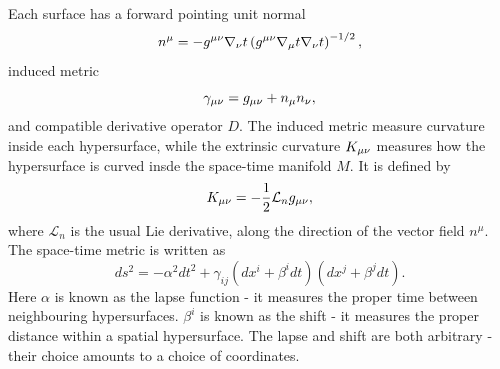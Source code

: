  Each surface has a forward pointing unit normal
\begin{equation}
n^{\mu}=-g^{\mu\nu}\nabla_{\nu}t\left(g^{\mu\nu}\nabla_{\mu}t\nabla_{\nu}t\right)^{-1/2},
\end{equation}
induced metric
\begin{equation}
\gamma_{\mu\nu}=g_{\mu\nu}+n_{\mu}n_{\nu},
\end{equation}
and compatible derivative operator $D$.
The induced metric measure curvature inside each hypersurface, while the extrinsic curvature $K_{\mu\nu}$ measures how the hypersurface is curved insde the space-time manifold $M$. It is defined by 
\begin{equation}
K_{\mu\nu}=-\frac{1}{2}\mathcal{L}_{n}g_{\mu\nu},
\end{equation}
where $\mathcal{L}_n$ is the usual Lie derivative, along the direction of the vector field $n^{\mu}$.
The space-time metric is written as
\begin{equation}
ds^2=-\alpha^2dt^2 + \gamma_{ij}\left(dx^i+\beta^idt\right)\left(dx^j+\beta^jdt\right).
\end{equation}
Here $\alpha$ is known as the lapse function - it measures the proper time between neighbouring hypersurfaces. $\beta^i$ is known as the shift - it measures the proper distance within a spatial hypersurface. The lapse and shift are both arbitrary - their choice amounts to a choice of coordinates.


